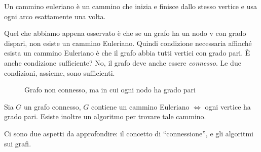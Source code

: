 \begin{defn}
Un cammino euleriano \`e un cammino che inizia e finisce dallo stesso vertice e usa ogni arco esattamente una volta.
\end{defn}

Quel che abbiamo appena osservato \`e che se un grafo ha un nodo v con grado dispari, non esiste un cammino Euleriano. Quindi condizione necessaria affinch\'e esista un cammino Euleriano \`e che il grafo abbia tutti vertici con grado pari. \`E anche condizione sufficiente? No, il grafo deve anche essere \emph{connesso}. Le due condizioni, assieme, sono sufficienti.

\begin{figure}
\centering
\caption{Grafo non connesso, ma in cui ogni nodo ha grado pari}
\end{figure}

\begin{theorem}
Sia $G$ un grafo connesso, $G$ contiene un cammino Euleriano $\iff$ ogni vertice ha grado pari. Esiste inoltre un algoritmo per trovare tale cammino.
\end{theorem}

Ci sono due aspetti da approfondire: il concetto di ``connessione'', e gli algoritmi sui grafi.

